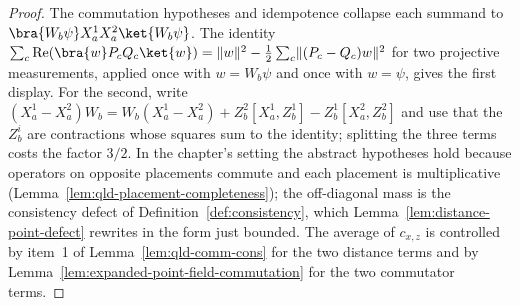 \begin{proof}
	\leanok
	The commutation hypotheses and idempotence collapse each summand to
	$\bra{W_b \psi} X^1_a X^2_a \ket{W_b \psi}$. The identity
	$\sum_c \operatorname{Re}\!\left(\bra{w} P_c Q_c \ket{w}\right) = \lVert w \rVert^2
	- \tfrac12 \sum_c \lVert (P_c - Q_c) w \rVert^2$ for two projective
	measurements, applied once with $w = W_b \psi$ and once with $w = \psi$,
	gives the first display. For the second, write
	$(X^1_a - X^2_a) W_b = W_b (X^1_a - X^2_a)
	+ Z^2_b [X^1_a, Z^1_b] - Z^1_b [X^2_a, Z^2_b]$ and use that the $Z^i_b$
	are contractions whose squares sum to the identity; splitting the three
	terms costs the factor $3/2$.
	In the chapter's setting the abstract hypotheses hold because operators on
	opposite placements commute and each placement is multiplicative
	(Lemma~\ref{lem:qld-placement-completeness}); the off-diagonal mass is the
	consistency defect of Definition~\ref{def:consistency}, which
	Lemma~\ref{lem:distance-point-defect} rewrites in the form just bounded.
	The average of $c_{x,z}$ is controlled by item~1 of
	Lemma~\ref{lem:qld-comm-cons} for the two distance terms and by
	Lemma~\ref{lem:expanded-point-field-commutation} for the two commutator
	terms.
\end{proof}

